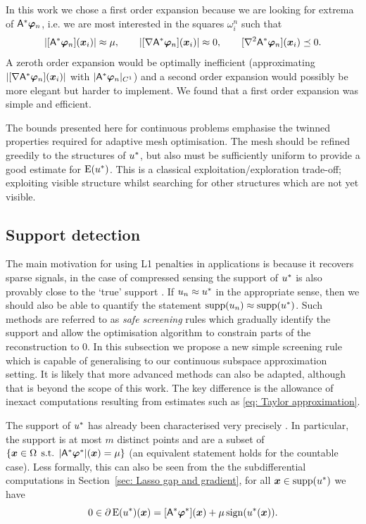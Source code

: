 \documentclass[smallextended]{svjour3}
\newcommand{\op}[1]{\operatorname{#1}}
\newcommand{\1}{\F{1}}
\DeclareMathOperator{\st}{\;s.t.\;}
\DeclareMathOperator{\supp}{supp}
\DeclareMathOperator{\sign}{sign}
\newcommand*{\varf}[1]{%
	\IfEqCase{#1}{%
		{0}{u}%
		{1}{v}%
		{2}{w}%
	}[u#1]%
}
\newcommand*{\vard}[1]{%
	\IfEqCase{#1}{%
		{0}{\varphi}%
		{1}{\psi}%
	}[\varphi #1]%
}
\newcommand*{\varx}[1]{%
	\IfEqCase{#1}{%
		{0}{x}%
		{1}{y}%
		{2}{z}%
		{3}{r}%
	}[x#1]%
}
\newcommand{\Domain}{\Omega}\newcommand{\domain}{\omega}
\newcommand*{\vvarx}[1]{\vec{\varx{#1}}}
\newcommand*{\vvard}[1]{\vec{\vard{#1}}}
\newcommand{\edit}[2]{{\ifmmode\text{\color{red}\sout{\ensuremath{#1}}}\else {\color{red} \sout{#1}}\fi} {\color{darkgreen} #2}}
\begin{document}
	In this work we chose a first order expansion because we are looking for extrema of $\A^*\vvard0_n$, i.e. we are most interested in the squares $\domain_i^n$ such that 
	\begin{equation}
		|[\A^*\vvard0_n](\vvarx0_i)| \approx \mu, \qquad |[\nabla\A^*\vvard0_n](\vvarx0_i)| \approx 0, \qquad [\nabla^2\A^*\vvard0_n](\vvarx0_i) \preceq 0. 
	\end{equation}
	A zeroth order expansion would be optimally inefficient (approximating $|[\nabla\A^*\vvard0_n](\vvarx0_i)|$ with $|\A^*\vvard0_n|_{C^1}$) and a second order expansion would possibly be more elegant but harder to implement. We found that a first order expansion was simple and efficient.
	
	The bounds presented here for continuous \edit{Lasso}{problems} emphasise the twinned properties required for adaptive mesh optimisation. The mesh should be refined greedily to the structures of $\varf0^*$, but also must be sufficiently uniform to provide a good estimate for $\op{E}(\varf0^*)$. This is a classical exploitation/exploration trade-off; exploiting visible structure whilst searching for other structures which are not yet visible.
	
	
	
	\subsection{Support detection}\label{sec: support detection}
	The main motivation for using \edit{Lasso}{L1 penalties} in applications is because it recovers sparse signals, in the case of compressed sensing the support of $\varf0^*$ is also provably close to the `true' support \cite{Duval2017a,Poon2018}. If $\varf0_n\approx \varf0^*$ in the appropriate sense, then we should also be able to quantify the statement $\op{supp}(\varf0_n)\approx\op{supp}(\varf0^*)$. Such methods are referred to as \emph{safe screening} rules \cite{ElGhaoui2010} which gradually identify the support and allow the optimisation algorithm to constrain parts of the reconstruction to 0. In this subsection we propose a new simple screening rule which is capable of generalising to our continuous subspace approximation setting. It is likely that more advanced methods \cite{Bonnefoy2015,Ndiaye2017} can also be adapted, although that is beyond the scope of this work. The key difference is the allowance of inexact computations resulting from estimates such as \eqref{eq: Taylor approximation}.
	
	The support of $\varf0^*$ has already been characterised very precisely \cite{Duval2017a,Poon2018}. In particular, the support is at most $m$ distinct points and are a subset of $\{ \vvarx0\in\Domain \st |\A^*\vvard0^*|(\vvarx0) = \mu\} $ (an equivalent statement holds for the countable case). Less formally, this can also be seen from the the \edit{gradient}{subdifferential} computations in Section~\ref{sec: Lasso gap and gradient}, for all $\vvarx0\in\supp(\varf0^*)$ we have
	\begin{equation}
		0\in \partial \op{E}(\varf0^*)(\vvarx0) = [\A^*\vvard0^*](\vvarx0) + \mu\sign(\varf0^*(\vvarx0)).
	\end{equation}
	
\end{document}
